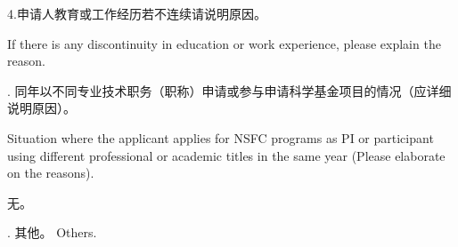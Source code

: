 \documentclass[12pt,UTF8,AutoFakeBold=4,a4paper]{ctexart}
\begin{document}
\bigskip

{\sihao \color{MsBlue} \kaishu 4.申请人教育或工作经历若不连续请说明原因。}

\bigskip

{\color{MsBlue} \xiaosihao {} 
If there is any discontinuity in education or work experience, please explain the reason.}

{\sihao \color{MsBlue} . 同年以不同专业技术职务（职称）申请或参与申请科学基金项目的情况（应详细说明原因）。 

\bigskip

\xiaosihao {} Situation where the applicant applies for NSFC programs as PI or participant using different professional or academic titles in the same year (Please elaborate on the reasons).}

\bigskip

无。

\bigskip

{\sihao \color{MsBlue} . 其他。 
\xiaosihao {} Others.}
\end{document}
